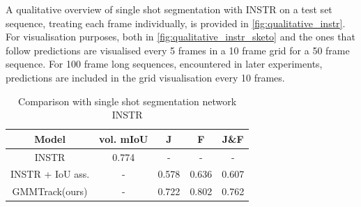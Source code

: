 A qualitative overview of single shot segmentation with INSTR on a test set sequence, treating each frame individually, is provided in \figref\ref{fig:qualitative_instr}. For visualisation purposes, both in \figref\ref{fig:qualitative_instr_sketo} and the ones that follow predictions are visualised every 5 frames in a 10 frame grid for a 50 frame sequence. For 100 frame long sequences, encountered in later experiments, predictions are included in the grid visualisation every 10 frames. \par



\begin{table} [ht!]
\caption{Comparison with single shot segmentation network INSTR}
\centering

\begin{tabular}{|c|c|c|c|c|} 
\hline
Model    & vol. mIoU & J &  F & J\&F\\ 
\hline

INSTR & 0.774 & - & - & - \\
INSTR + IoU ass. & - & 0.578 &  0.636 & 0.607\\
GMMTrack(ours) & - & 0.722  & 0.802 & 0.762  \\
\hline
\end{tabular}
\end{table}


